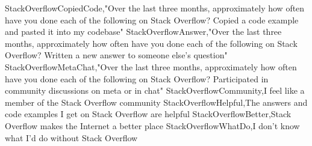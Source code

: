 \begin{appendices}
StackOverflowCopiedCode,"Over the last three months, approximately how often have you done each of the following on Stack Overflow? Copied a code example and pasted it into my codebase"
StackOverflowAnswer,"Over the last three months, approximately how often have you done each of the following on Stack Overflow? Written a new answer to someone else's question"
StackOverflowMetaChat,"Over the last three months, approximately how often have you done each of the following on Stack Overflow? Participated in community discussions on meta or in chat"
StackOverflowCommunity,I feel like a member of the Stack Overflow community
StackOverflowHelpful,The answers and code examples I get on Stack Overflow are helpful
StackOverflowBetter,Stack Overflow makes the Internet a better place
StackOverflowWhatDo,I don't know what I'd do without Stack Overflow



\end{appendices}
